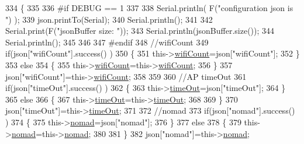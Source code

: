 \begin{DoxyCode}
334         \{
335         
336 \textcolor{preprocessor}{        #if DEBUG == 1 }
337         
338             Serial.println( F(\textcolor{stringliteral}{"configuration json is "}) );
339             json.printTo(Serial);
340             Serial.println();
341 
342             Serial.print(F(\textcolor{stringliteral}{"jsonBuffer size: "}));
343             Serial.println(jsonBuffer.size());
344             Serial.println();
345 
346 
347 \textcolor{preprocessor}{        #endif}
348             \textcolor{comment}{//wifiCount}
349             \textcolor{keywordflow}{if}(json[\textcolor{stringliteral}{"wifiCount"}].success() )
350             \{           
351                 this->\hyperlink{classCoolWifi_ab133bd92fcb895b884deecd6678592e4}{wifiCount}=json[\textcolor{stringliteral}{"wifiCount"}];
352             \}
353             \textcolor{keywordflow}{else}
354             \{
355                 this->\hyperlink{classCoolWifi_ab133bd92fcb895b884deecd6678592e4}{wifiCount}=this->\hyperlink{classCoolWifi_ab133bd92fcb895b884deecd6678592e4}{wifiCount};
356             \}
357             json[\textcolor{stringliteral}{"wifiCount"}]=this->\hyperlink{classCoolWifi_ab133bd92fcb895b884deecd6678592e4}{wifiCount};
358 
359             
360             \textcolor{comment}{//AP timeOut}
361             \textcolor{keywordflow}{if}(json[\textcolor{stringliteral}{"timeOut"}].success() )
362             \{
363                 this->\hyperlink{classCoolWifi_a952111605f25156588b5632caaba1c6f}{timeOut}=json[\textcolor{stringliteral}{"timeOut"}];
364             \}
365             \textcolor{keywordflow}{else}
366             \{
367                 this->\hyperlink{classCoolWifi_a952111605f25156588b5632caaba1c6f}{timeOut}=this->\hyperlink{classCoolWifi_a952111605f25156588b5632caaba1c6f}{timeOut};
368 
369             \}
370             json[\textcolor{stringliteral}{"timeOut"}]=this->\hyperlink{classCoolWifi_a952111605f25156588b5632caaba1c6f}{timeOut};
371 
372             \textcolor{comment}{//nomad}
373             \textcolor{keywordflow}{if}(json[\textcolor{stringliteral}{"nomad"}].success() )
374             \{
375                 this->\hyperlink{classCoolWifi_ab7d9643c4af7bac3be331ef008b2ea27}{nomad}=json[\textcolor{stringliteral}{"nomad"}];
376             \}
377             \textcolor{keywordflow}{else}
378             \{
379                 this->\hyperlink{classCoolWifi_ab7d9643c4af7bac3be331ef008b2ea27}{nomad}=this->\hyperlink{classCoolWifi_ab7d9643c4af7bac3be331ef008b2ea27}{nomad};
380 
381             \}
382             json[\textcolor{stringliteral}{"nomad"}]=this->\hyperlink{classCoolWifi_ab7d9643c4af7bac3be331ef008b2ea27}{nomad};

\end{DoxyCode}

